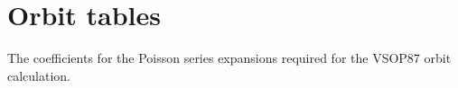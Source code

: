 \section{Orbit tables}\label{app:orbit_tables}

The coefficients for the Poisson series expansions required for the
VSOP87 orbit calculation.

\small

 \label{tab:L1}
%
%
\tablelasttail{\hline \hline}
